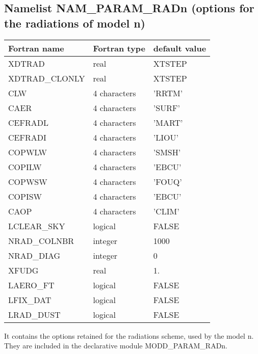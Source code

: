 \subsection{Namelist NAM\_PARAM\_RADn (options for the radiations of model n)}

\begin{center}
\begin{tabular} {|l|l|l|}
\hline
Fortran name & Fortran type & default value \\
\hline
XDTRAD         &  real          & XTSTEP \\
XDTRAD\_CLONLY &  real          & XTSTEP \\
CLW            &  4 characters  & 'RRTM'   \\
CAER           &  4 characters  & 'SURF'   \\
CEFRADL        &  4 characters  & 'MART'   \\
CEFRADI        &  4 characters  & 'LIOU'   \\
COPWLW         &  4 characters  & 'SMSH'   \\
COPILW         &  4 characters  & 'EBCU'   \\
COPWSW         &  4 characters  & 'FOUQ'   \\
COPISW         &  4 characters  & 'EBCU'   \\
CAOP           &  4 characters  & 'CLIM'   \\
LCLEAR\_SKY    & logical        & FALSE  \\
NRAD\_COLNBR   & integer        & 1000   \\
NRAD\_DIAG     & integer        & 0  \\
XFUDG          & real           &   1.   \\
LAERO\_FT      & logical        & FALSE  \\
LFIX\_DAT      & logical        & FALSE  \\
LRAD\_DUST     & logical        & FALSE  \\
\hline
\end{tabular}
\end{center}

It contains the options retained for the radiations scheme, used by the 
model n. They are
included in the declarative module MODD\_PARAM\_RADn.

